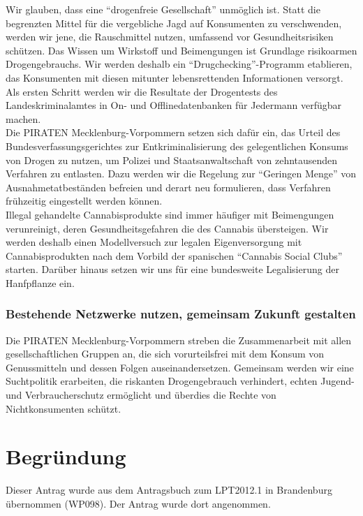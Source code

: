 Wir glauben, dass eine ``drogenfreie Gesellschaft'' unmöglich ist. Statt die begrenzten Mittel für die vergebliche Jagd auf Konsumenten zu verschwenden, werden wir jene, die Rauschmittel nutzen, umfassend vor Gesundheitsrisiken schützen. Das Wissen um Wirkstoff und Beimengungen ist Grundlage risikoarmen Drogengebrauchs. Wir werden deshalb ein ``Drugchecking''-Programm etablieren, das Konsumenten mit diesen mitunter lebensrettenden Informationen versorgt. Als ersten Schritt werden wir die Resultate der Drogentests des Landeskriminalamtes in On- und Offlinedatenbanken für Jedermann verfügbar machen.\\Die PIRATEN Mecklenburg-Vorpommern setzen sich dafür ein, das Urteil des Bundesverfassungsgerichtes zur Entkriminalisierung des gelegentlichen Konsums von Drogen zu nutzen, um Polizei und Staatsanwaltschaft von zehntausenden Verfahren zu entlasten. Dazu werden wir die Regelung zur ``Geringen Menge'' von Ausnahmetatbeständen befreien und derart neu formulieren, dass Verfahren frühzeitig eingestellt werden können.\\Illegal gehandelte Cannabisprodukte sind immer häufiger mit Beimengungen verunreinigt, deren Gesundheitsgefahren die des Cannabis übersteigen. Wir werden deshalb einen Modellversuch zur legalen Eigenversorgung mit Cannabisprodukten nach dem Vorbild der spanischen ``Cannabis Social Clubs'' starten. Darüber hinaus setzen wir uns für eine bundesweite Legalisierung der Hanfpflanze ein.

\subsubsection{Bestehende Netzwerke nutzen, gemeinsam Zukunft gestalten}

Die PIRATEN Mecklenburg-Vorpommern streben die Zusammenarbeit mit allen gesellschaftlichen Gruppen an, die sich vorurteilsfrei mit dem Konsum von Genussmitteln und dessen Folgen auseinandersetzen. Gemeinsam werden wir eine Suchtpolitik erarbeiten, die riskanten Drogengebrauch verhindert, echten Jugend- und Verbraucherschutz ermöglicht und überdies die Rechte von Nichtkonsumenten schützt.

\section{Begründung}

Dieser Antrag wurde aus dem Antragsbuch zum LPT2012.1 in Brandenburg übernommen (WP098). Der Antrag wurde dort angenommen.
